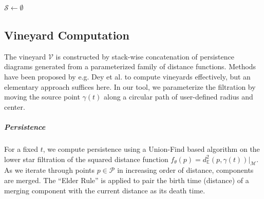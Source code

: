 \documentclass[a4paper,english,numberwithinsect]{eurocg26-submission}
\newcommand{\M}{\mathcal{M}}
\begin{document}
\begin{algorithm}[t]
\caption{Discrete Symmetry Set Computation}
\label{alg:symmetry_set}
\DontPrintSemicolon
{}

$\mathcal{S} \gets \emptyset$\;
\end{algorithm}

\subsection{Vineyard Computation}

The vineyard $\mathcal{V}$ is constructed by stack-wise concatenation of persistence diagrams generated from a parameterized family of distance functions. Methods have been proposed by e.g. Dey et al. \cite{tamalrevisit} to compute vineyards effectively, but an elementary approach suffices here. %
In our tool, we parameterize the filtration by moving the source point $\gamma(t)$ along a circular path of user-defined radius and center.

\subparagraph{Persistence}
For a fixed $t$, we compute persistence using a Union-Find based algorithm on the lower star filtration of the squared distance function $f_\theta(p) = d_{\mathbb{E}}^2(p,\gamma(t))|_\M$. As we iterate through points $p \in \mathcal{P}$ in increasing order of distance, components are merged. The ``Elder Rule'' is applied to pair the birth time (distance) of a merging component with the current distance as its death time.
\end{document}
